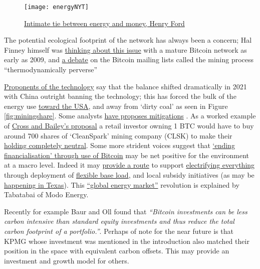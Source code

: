 \begin{figure}
  \centering
    \texttt{[image: energyNYT]}
  \caption{\href{https://www.nytimes.com/1921/12/06/archives/mr-fords-energy-dollar.html}{Intimate tie between energy and money, Henry Ford}}
  \label{fig:energyNYT}
\end{figure}
The potential ecological footprint of the network has always been a concern; Hal Finney himself was \href{https://twitter.com/halfin/status/1153096538}{thinking about this issue} with a mature Bitcoin network as early as 2009, and \href{https://satoshi.nakamotoinstitute.org/posts/bitcointalk/threads/167/#35}{a debate} on the Bitcoin mailing lists called the mining process ``thermodynamically perverse'' \par
\href{https://electricmoney.org/}{Proponents of the technology} say that the balance shifted dramatically in 2021 with China outright banning the technology; this has forced the bulk of the energy use \href{https://docs.google.com/spreadsheets/d/1E7489rM7Q62oXwk1f4NUlMvok9noAbpYfTynY2VTyww/edit#gid=0}{toward the USA}, and away from `dirty coal' as seen in Figure \ref{fig:miningshare}. Some analysts \href{https://docs.google.com/document/d/1N2N-5jY00cmteoY_puWI9oosM1foa4EQqsO1FFfIFR4/edit}{have proposes mitigations} \cite{cross2021greening}. As a worked example of \href{https://docs.google.com/spreadsheets/d/15e_a-D3x4fv3tglEzFmQ6TLQx0fZe6-iKO9Fc9SyISQ/edit#gid=0}{Cross and Bailey's proposal} a retail investor owning 1 BTC would have to buy around 700 shares of `CleanSpark' mining company (CLSK) to make their \href{https://docs.google.com/spreadsheets/d/1r32T8p_PHTP8S781u7PhPSwehLx2VcJTaJJKesMswD0/edit#gid=0}{holding completely neutral}.  Some more strident voices suggest that \href{https://medium.com/@magusperivallon/a-financial-hail-mary-for-the-climate-an-argument-for-bitcoin-adoption-9c58e707d0}{`ending financialisation' through use of Bitcoin} may be net positive for the environment at a macro level. Indeed it may \href{https://www.newsweek.com/bitcoin-mining-americas-most-misunderstood-industry-opinion-1669892}{provide a route} to support \href{https://mobile.twitter.com/DSBatten/status/1514072998881665027}{electrifying everything} through deployment of \href{https://lancium.com/solutions/}{flexible base load}, and local subsidy initiatives (as may be \href{https://braiins.com/blog/bitcoin-mining-the-grid-generators}{happening in Texas})\cite{griffith2021electrify, ercotimpact2021}. This \href{https://www.citadel21.com/bitcoin-is-the-first-global-market-for-electricity-and-will-unleash-renewables}{``global energy market''} revolution is explained by Tabatabai of Modo Energy.\par Recently for example Baur and Oll found that \textit{``Bitcoin investments can be less carbon intensive than standard equity investments and thus reduce the total carbon footprint of a portfolio.''}\cite{baur2021bitcoin}. Perhaps of note for the near future is that KPMG whose investment was mentioned in the introduction also matched their position in the space with equivalent  carbon offsets. This may provide an investment and growth model for others.
